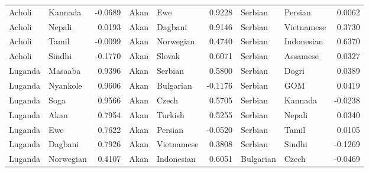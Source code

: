 \documentclass[11pt]{article} %
\begin{document}
\begin{table}
\begin{tabular}{llr@{\hspace{12pt}}llr@{\hspace{12pt}}llr}
            Acholi                       & Kannada             & -0.0689       & Akan                & Ewe                 & 0.9228        & Serbian             & Persian             & 0.0062        \\
            Acholi                       & Nepali              & 0.0193        & Akan                & Dagbani             & 0.9146        & Serbian             & Vietnamese          & 0.3730        \\
            Acholi                       & Tamil               & -0.0099       & Akan                & Norwegian           & 0.4740        & Serbian             & Indonesian          & 0.6370        \\
            Acholi                       & Sindhi              & -0.1770       & Akan                & Slovak              & 0.6071        & Serbian             & Assamese            & 0.0327        \\
            Luganda                      & Masaaba             & 0.9396        & Akan                & Serbian             & 0.5800        & Serbian             & Dogri               & 0.0389        \\
            Luganda                      & Nyankole            & 0.9606        & Akan                & Bulgarian           & -0.1176       & Serbian             & GOM                 & 0.0419        \\
            Luganda                      & Soga                & 0.9566        & Akan                & Czech               & 0.5705        & Serbian             & Kannada             & -0.0238       \\
            Luganda                      & Akan                & 0.7954        & Akan                & Turkish             & 0.5255        & Serbian             & Nepali              & 0.0340        \\
            Luganda                      & Ewe                 & 0.7622        & Akan                & Persian             & -0.0520       & Serbian             & Tamil               & 0.0105        \\
            Luganda                      & Dagbani             & 0.7926        & Akan                & Vietnamese          & 0.3808        & Serbian             & Sindhi              & -0.1269       \\
            Luganda                      & Norwegian           & 0.4107        & Akan                & Indonesian          & 0.6051        & Bulgarian           & Czech               & -0.0469       \\

\end{tabular}
\end{table}
\end{document}
